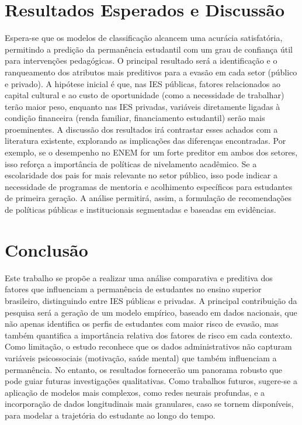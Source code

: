 \documentclass[english, brazilian]{RBIEarticle}
\begin{document}
\section{Resultados Esperados e Discussão}
Espera-se que os modelos de classificação alcancem uma acurácia satisfatória, permitindo a predição da permanência estudantil com um grau de confiança útil para intervenções pedagógicas. O principal resultado será a identificação e o ranqueamento dos atributos mais preditivos para a evasão em cada setor (público e privado). A hipótese inicial é que, nas IES públicas, fatores relacionados ao capital cultural e ao custo de oportunidade (como a necessidade de trabalhar) terão maior peso, enquanto nas IES privadas, variáveis diretamente ligadas à condição financeira (renda familiar, financiamento estudantil) serão mais proeminentes. A discussão dos resultados irá contrastar esses achados com a literatura existente, explorando as implicações das diferenças encontradas. Por exemplo, se o desempenho no ENEM for um forte preditor em ambos dos setores, isso reforça a importância de políticas de nivelamento acadêmico. Se a escolaridade dos pais for mais relevante no setor público, isso pode indicar a necessidade de programas de mentoria e acolhimento específicos para estudantes de primeira geração. A análise permitirá, assim, a formulação de recomendações de políticas públicas e institucionais segmentadas e baseadas em evidências.

\section{Conclusão}
Este trabalho se propõe a realizar uma análise comparativa e preditiva dos fatores que influenciam a permanência de estudantes no ensino superior brasileiro, distinguindo entre IES públicas e privadas. A principal contribuição da pesquisa será a geração de um modelo empírico, baseado em dados nacionais, que não apenas identifica os perfis de estudantes com maior risco de evasão, mas também quantifica a importância relativa dos fatores de risco em cada contexto. Como limitação, o estudo reconhece que os dados administrativos não capturam variáveis psicossociais (motivação, saúde mental) que também influenciam a permanência. No entanto, os resultados fornecerão um panorama robusto que pode guiar futuras investigações qualitativas. Como trabalhos futuros, sugere-se a aplicação de modelos mais complexos, como redes neurais profundas, e a incorporação de dados longitudinais mais granulares, caso se tornem disponíveis, para modelar a trajetória do estudante ao longo do tempo.
\end{document}

